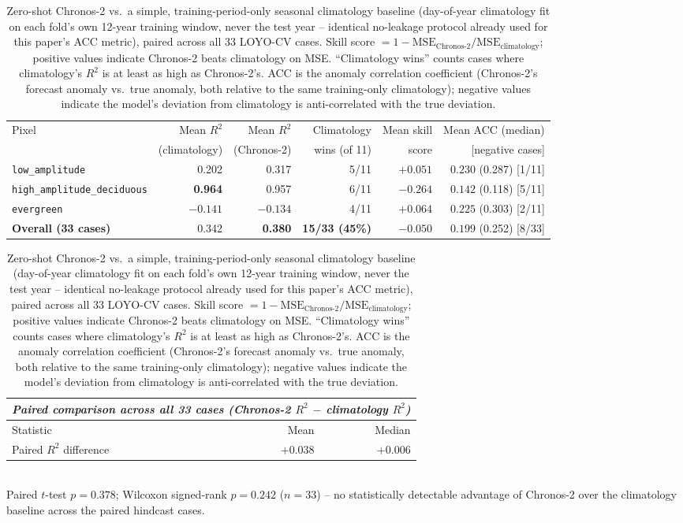 \begin{table}[t]
\centering
\caption{Zero-shot Chronos-2 vs.\ a simple, training-period-only seasonal climatology baseline
(day-of-year climatology fit on each fold's own 12-year training window, never the test year --
identical no-leakage protocol already used for this paper's ACC metric), paired across all 33
LOYO-CV cases. Skill score $= 1 - \mathrm{MSE}_{\text{Chronos-2}}/\mathrm{MSE}_{\text{climatology}}$;
positive values indicate Chronos-2 beats climatology on MSE. ``Climatology wins'' counts cases
where climatology's $R^2$ is at least as high as Chronos-2's. ACC is the anomaly correlation
coefficient (Chronos-2's forecast anomaly vs.\ true anomaly, both relative to the same training-only
climatology); negative values indicate the model's deviation from climatology is anti-correlated
with the true deviation.}
\label{tab:climatology}
\small
\begin{tabular}{@{}lrrrrr@{}}
\toprule
Pixel & Mean $R^2$ & Mean $R^2$ & Climatology & Mean skill & Mean ACC (median) \\
      & (climatology) & (Chronos-2) & wins (of 11) & score & [negative cases] \\
\midrule
\texttt{low\_amplitude}            & 0.202  & 0.317  & 5/11 & $+0.051$ & $0.230$ (0.287) [1/11] \\
\texttt{high\_amplitude\_deciduous} & \textbf{0.964} & 0.957 & 6/11 & $-0.264$ & $0.142$ (0.118) [5/11] \\
\texttt{evergreen}                 & $-0.141$ & $-0.134$ & 4/11 & $+0.064$ & $0.225$ (0.303) [2/11] \\
\midrule
\textbf{Overall (33 cases)} & 0.342 & \textbf{0.380} & \textbf{15/33 (45\%)} & $-0.050$ & $0.199$ (0.252) [8/33] \\
\bottomrule
\end{tabular}

\vspace{0.5em}
\begin{tabular}{@{}lrr@{}}
\multicolumn{3}{l}{\textit{Paired comparison across all 33 cases (Chronos-2 $R^2$ $-$ climatology $R^2$)}} \\
\toprule
Statistic & Mean & Median \\
\midrule
Paired $R^2$ difference & $+0.038$ & $+0.006$ \\
\bottomrule
\end{tabular}
\\[0.3em]
\footnotesize Paired $t$-test $p = 0.378$; Wilcoxon signed-rank $p = 0.242$ ($n=33$) -- no
statistically detectable advantage of Chronos-2 over the climatology baseline across the paired
hindcast cases.
\end{table}
